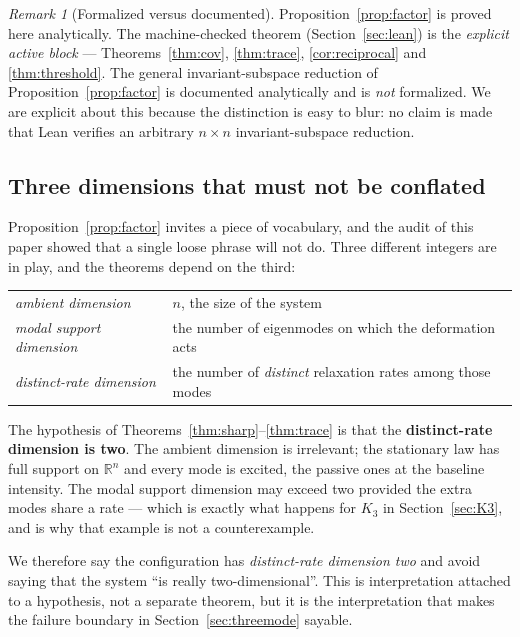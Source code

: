 \documentclass[11pt]{article}
\theoremstyle{plain}
\theoremstyle{definition}
\theoremstyle{remark}
\newtheorem{remark}[theorem]{Remark}
\newcommand{\Real}{\mathbb{R}}
\begin{document}
\begin{remark}[Formalized versus documented]\label{rem:formalized}
Proposition~\ref{prop:factor} is proved here analytically. The machine-checked theorem
(Section~\ref{sec:lean}) is the \emph{explicit active block} --- Theorems~\ref{thm:cov},
\ref{thm:trace}, \ref{cor:reciprocal} and \ref{thm:threshold}. The general
invariant-subspace reduction of Proposition~\ref{prop:factor} is documented analytically and is
\emph{not} formalized. We are explicit about this because the distinction is easy to blur: no
claim is made that Lean verifies an arbitrary $n\times n$ invariant-subspace reduction.
\end{remark}

\subsection{Three dimensions that must not be conflated}\label{sec:effdim}

Proposition~\ref{prop:factor} invites a piece of vocabulary, and the audit of this paper showed
that a single loose phrase will not do. Three different integers are in play, and the theorems
depend on the third:

\begin{center}
\begin{tabular}{@{}ll@{}}
\toprule
\emph{ambient dimension} & $n$, the size of the system\\
\emph{modal support dimension} & the number of eigenmodes on which the deformation acts\\
\emph{distinct-rate dimension} & the number of \emph{distinct} relaxation rates among those modes\\
\bottomrule
\end{tabular}
\end{center}

The hypothesis of Theorems~\ref{thm:sharp}--\ref{thm:trace} is that the \textbf{distinct-rate
dimension is two}. The ambient dimension is irrelevant; the stationary law has full support on
$\Real^n$ and every mode is excited, the passive ones at the baseline intensity. The modal
support dimension may exceed two provided the extra modes share a rate --- which is exactly what
happens for $K_3$ in Section~\ref{sec:K3}, and is why that example is not a counterexample.

We therefore say the configuration has \emph{distinct-rate dimension two} and avoid saying that
the system ``is really two-dimensional''. This is interpretation attached to a hypothesis, not a
separate theorem, but it is the interpretation that makes the failure boundary in
Section~\ref{sec:threemode} sayable.
\end{document}
